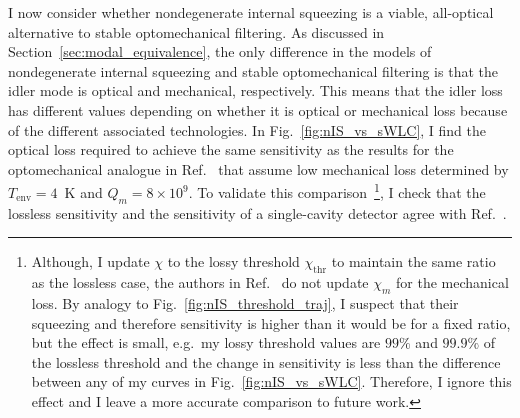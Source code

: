 I now consider whether nondegenerate internal squeezing is a viable, all-optical alternative to stable optomechanical filtering.
As discussed in Section~\ref{sec:modal_equivalence}, the only difference in the models of nondegenerate internal squeezing and stable optomechanical filtering is that the idler mode is optical and mechanical, respectively. This means that the idler loss has different values depending on whether it is optical or mechanical loss because of the different associated technologies.
In Fig.~\ref{fig:nIS_vs_sWLC}, I find the optical loss required to achieve the same sensitivity as the results for the optomechanical analogue in Ref.~\cite{liBroadbandSensitivityImprovement2020} that assume low mechanical loss determined by $T_\text{env}=4$~K and $Q_m=8\times10^9$. %
To validate this comparison~\footnote{Although, I update $\chi$ to the lossy threshold $\chi_\text{thr}$ to maintain the same ratio as the lossless case, the authors in Ref.~\cite{liBroadbandSensitivityImprovement2020} do not update $\chi_m$ for the mechanical loss. By analogy to Fig.~\ref{fig:nIS_threshold_traj}, I suspect that their squeezing and therefore sensitivity is higher than it would be for a fixed ratio, but the effect is small, e.g.\ my lossy threshold values are $99\%$ and $99.9\%$ of the lossless threshold and the change in sensitivity is less than the difference between any of my curves in Fig.~\ref{fig:nIS_vs_sWLC}. Therefore, I ignore this effect and I leave a more accurate comparison to future work.}, I check that the lossless sensitivity and the sensitivity of a single-cavity detector agree with Ref.~\cite{liBroadbandSensitivityImprovement2020}. %
